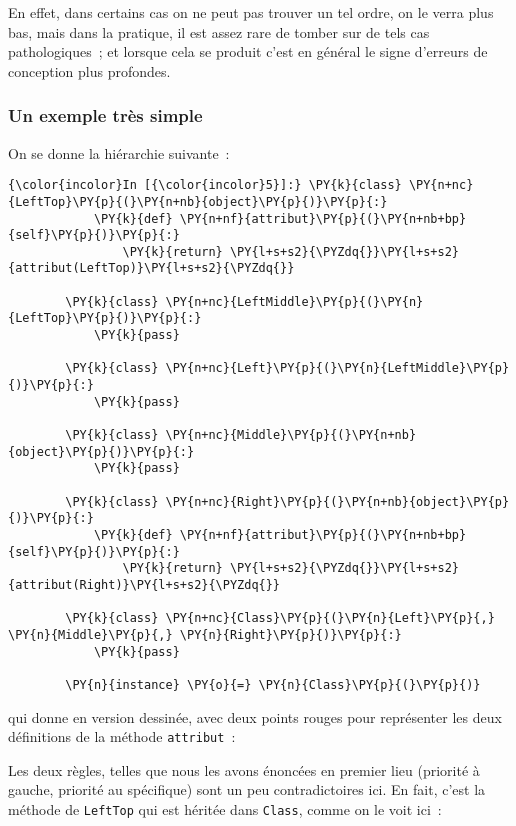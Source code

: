 En effet, dans certains cas on ne peut pas trouver un tel ordre, on le
verra plus bas, mais dans la pratique, il est assez rare de tomber sur
de tels cas pathologiques~; et lorsque cela se produit c'est en général
le signe d'erreurs de conception plus profondes.

    \hypertarget{un-exemple-truxe8s-simple}{%
\subsubsection{Un exemple très simple}\label{un-exemple-truxe8s-simple}}

    On se donne la hiérarchie suivante~:

    \begin{Verbatim}[commandchars=\\\{\}]
{\color{incolor}In [{\color{incolor}5}]:} \PY{k}{class} \PY{n+nc}{LeftTop}\PY{p}{(}\PY{n+nb}{object}\PY{p}{)}\PY{p}{:}
            \PY{k}{def} \PY{n+nf}{attribut}\PY{p}{(}\PY{n+nb+bp}{self}\PY{p}{)}\PY{p}{:} 
                \PY{k}{return} \PY{l+s+s2}{\PYZdq{}}\PY{l+s+s2}{attribut(LeftTop)}\PY{l+s+s2}{\PYZdq{}}
            
        \PY{k}{class} \PY{n+nc}{LeftMiddle}\PY{p}{(}\PY{n}{LeftTop}\PY{p}{)}\PY{p}{:} 
            \PY{k}{pass}
        
        \PY{k}{class} \PY{n+nc}{Left}\PY{p}{(}\PY{n}{LeftMiddle}\PY{p}{)}\PY{p}{:} 
            \PY{k}{pass}
        
        \PY{k}{class} \PY{n+nc}{Middle}\PY{p}{(}\PY{n+nb}{object}\PY{p}{)}\PY{p}{:} 
            \PY{k}{pass}
        
        \PY{k}{class} \PY{n+nc}{Right}\PY{p}{(}\PY{n+nb}{object}\PY{p}{)}\PY{p}{:}
            \PY{k}{def} \PY{n+nf}{attribut}\PY{p}{(}\PY{n+nb+bp}{self}\PY{p}{)}\PY{p}{:} 
                \PY{k}{return} \PY{l+s+s2}{\PYZdq{}}\PY{l+s+s2}{attribut(Right)}\PY{l+s+s2}{\PYZdq{}}
        
        \PY{k}{class} \PY{n+nc}{Class}\PY{p}{(}\PY{n}{Left}\PY{p}{,} \PY{n}{Middle}\PY{p}{,} \PY{n}{Right}\PY{p}{)}\PY{p}{:} 
            \PY{k}{pass}
        
        \PY{n}{instance} \PY{o}{=} \PY{n}{Class}\PY{p}{(}\PY{p}{)}
\end{Verbatim}


    qui donne en version dessinée, avec deux points rouges pour représenter
les deux définitions de la méthode \texttt{attribut}~:

    Les deux règles, telles que nous les avons énoncées en premier lieu
(priorité à gauche, priorité au spécifique) sont un peu contradictoires
ici. En fait, c'est la méthode de \texttt{LeftTop} qui est héritée dans
\texttt{Class}, comme on le voit ici~:

